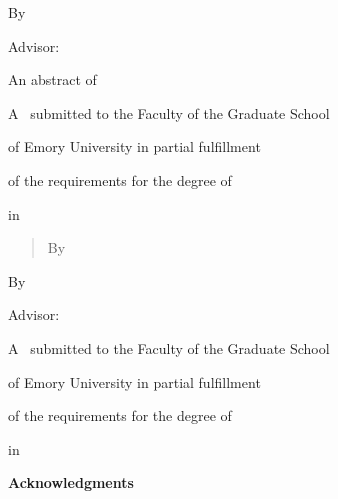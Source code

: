 \documentclass[11pt]{report}
\begin{document}
\begin{titlepage}
\vspace{ 1.5in}
\centerline{\mytitle}
\vspace{ 1in}
\centerline{By}
\vspace{ .25in}
\centerline{\myname}
\centerline{\mydegree}
\vspace{ .75in}
\centerline{Advisor: \myadvisor}

\vspace{1.5in}

\centerline{An abstract of}
\centerline{A \typeofthesis~submitted to the Faculty of the Graduate School}
\centerline{of Emory University in partial fulfillment}
\centerline{of the requirements for the degree of}
\centerline{\thisdegree}
\centerline{in \mydepartment}
\centerline{\thisyear}

\end{titlepage}


\begin{abstract}
\centerline{\mytitle}
\centerline{By \myname}
\vspace{0.25in}
\myabstract
\end{abstract}


\begin{titlepage}

\vspace{ 1.5in}
\centerline{\mytitle}
\vspace{1in}
\centerline{By}
\vspace{ .25in}
\centerline{\myname}
\centerline{
\mydegree
}
\vspace{ .75in}
\centerline{Advisor: \myadvisor}

\vspace{1.75in}

\centerline{A \typeofthesis~submitted to the Faculty of the Graduate School}
\centerline{of Emory University in partial fulfillment}
\centerline{of the requirements for the degree of}
\centerline{\thisdegree}
\centerline{in \mydepartment}
\centerline{\thisyear}
\end{titlepage}


\begin{titlepage}
\centerline{{\bf Acknowledgments}}
\vspace{.7in}
\myacknowledgments
\end{titlepage}


\begin{titlepage}
\vspace{2in}
\centerline{\emph{\mydedication}}
\end{titlepage}
\end{document}
